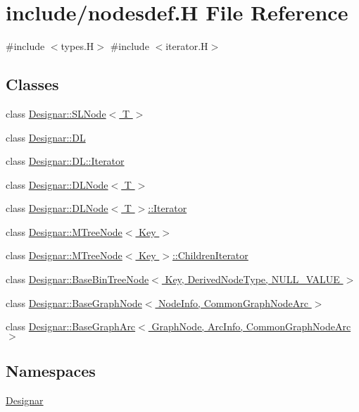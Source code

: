 \hypertarget{nodesdef_8_h}{}\section{include/nodesdef.H File Reference}
\label{nodesdef_8_h}
{\ttfamily \#include $<$types.\+H$>$}\newline
{\ttfamily \#include $<$iterator.\+H$>$}\newline
\subsection*{Classes}
\begin{DoxyCompactItemize}
\item 
class \hyperlink{class_designar_1_1_s_l_node}{Designar\+::\+S\+L\+Node$<$ T $>$}
\item 
class \hyperlink{class_designar_1_1_d_l}{Designar\+::\+DL}
\item 
class \hyperlink{class_designar_1_1_d_l_1_1_iterator}{Designar\+::\+D\+L\+::\+Iterator}
\item 
class \hyperlink{class_designar_1_1_d_l_node}{Designar\+::\+D\+L\+Node$<$ T $>$}
\item 
class \hyperlink{class_designar_1_1_d_l_node_1_1_iterator}{Designar\+::\+D\+L\+Node$<$ T $>$\+::\+Iterator}
\item 
class \hyperlink{class_designar_1_1_m_tree_node}{Designar\+::\+M\+Tree\+Node$<$ Key $>$}
\item 
class \hyperlink{class_designar_1_1_m_tree_node_1_1_children_iterator}{Designar\+::\+M\+Tree\+Node$<$ Key $>$\+::\+Children\+Iterator}
\item 
class \hyperlink{class_designar_1_1_base_bin_tree_node}{Designar\+::\+Base\+Bin\+Tree\+Node$<$ Key, Derived\+Node\+Type, N\+U\+L\+L\+\_\+\+V\+A\+L\+U\+E $>$}
\item 
class \hyperlink{class_designar_1_1_base_graph_node}{Designar\+::\+Base\+Graph\+Node$<$ Node\+Info, Common\+Graph\+Node\+Arc $>$}
\item 
class \hyperlink{class_designar_1_1_base_graph_arc}{Designar\+::\+Base\+Graph\+Arc$<$ Graph\+Node, Arc\+Info, Common\+Graph\+Node\+Arc $>$}
\end{DoxyCompactItemize}
\subsection*{Namespaces}
\begin{DoxyCompactItemize}
\item 
 \hyperlink{namespace_designar}{Designar}
\end{DoxyCompactItemize}
